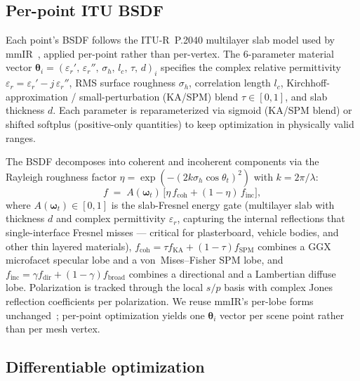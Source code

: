 \subsection{Per-point ITU BSDF}
\label{sec:methods:bsdf}

Each point's BSDF follows the ITU-R~P.2040 multilayer slab model used by mmIR~\cite{mmIR2026,itu_p2040,wei2024csvbsdf}, applied per-point rather than per-vertex. The 6-parameter material vector $\boldsymbol{\theta}_i = (\varepsilon_r',\,\varepsilon_r'',\,\sigma_h,\,l_c,\,\tau,\,d)_i$ specifies the complex relative permittivity $\varepsilon_r = \varepsilon_r' - j\,\varepsilon_r''$, RMS surface roughness $\sigma_h$, correlation length $l_c$, Kirchhoff-approximation / small-perturbation (KA/SPM) blend $\tau \in [0,1]$, and slab thickness $d$. Each parameter is reparameterized via sigmoid (KA/SPM blend) or shifted softplus (positive-only quantities) to keep optimization in physically valid ranges.

The BSDF decomposes into coherent and incoherent components via the Rayleigh roughness factor $\eta = \exp(-(2k\sigma_h\cos\theta_t)^2)$ with $k = 2\pi/\lambda$:
\begin{equation}
f \;=\; A(\boldsymbol{\omega}_t)\,\bigl[\eta\,f_{\text{coh}} + (1-\eta)\,f_{\text{inc}}\bigr],
\label{eq:bsdf_decomp}
\end{equation}
where $A(\boldsymbol{\omega}_t) \in [0,1]$ is the slab-Fresnel energy gate (multilayer slab with thickness $d$ and complex permittivity $\varepsilon_r$, capturing the internal reflections that single-interface Fresnel misses --- critical for plasterboard, vehicle bodies, and other thin layered materials), $f_{\text{coh}} = \tau f_{\text{KA}} + (1-\tau) f_{\text{SPM}}$ combines a GGX microfacet specular lobe and a von~Mises--Fisher SPM lobe, and $f_{\text{inc}} = \gamma f_{\text{dir}} + (1-\gamma) f_{\text{broad}}$ combines a directional and a Lambertian diffuse lobe. Polarization is tracked through the local $s/p$ basis with complex Jones reflection coefficients per polarization. We reuse mmIR's per-lobe forms unchanged~\cite{mmIR2026}; per-point optimization yields one $\boldsymbol{\theta}_i$ vector per scene point rather than per mesh vertex.

\subsection{Differentiable optimization}
\label{sec:methods:opt}


